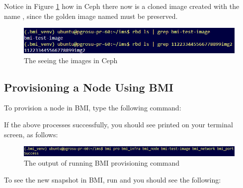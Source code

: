 Notice in Figure \ref{fig:ceph-imported-cloned-image} how in Ceph there now is a cloned image created with the name , since the golden image named  must be preserved.



\begin{figure}[!h] %
\begin{center}
\includegraphics[scale=0.7]{figures/rbd-ls-bmi-test-image.png}
\end{center}
\caption{The seeing the images in Ceph}
\label{fig:ceph-imported-cloned-image}
\end{figure}


\pagebreak

\subsection{Provisioning a Node Using BMI}

To provision a node in BMI, type the following command: 



If the above processes successfully, you should see  printed on your terminal screen, as follows: \\

\begin{figure}[!h] %
\label{fig:bmi-workflow}
\begin{center}
\includegraphics[scale=0.7]{figures/bmi-provisioning.png}
\end{center}
\caption{The output of running BMI provisioning command}
\end{figure}

To see the new snapshot in BMI, run  and you should see the following: \\

